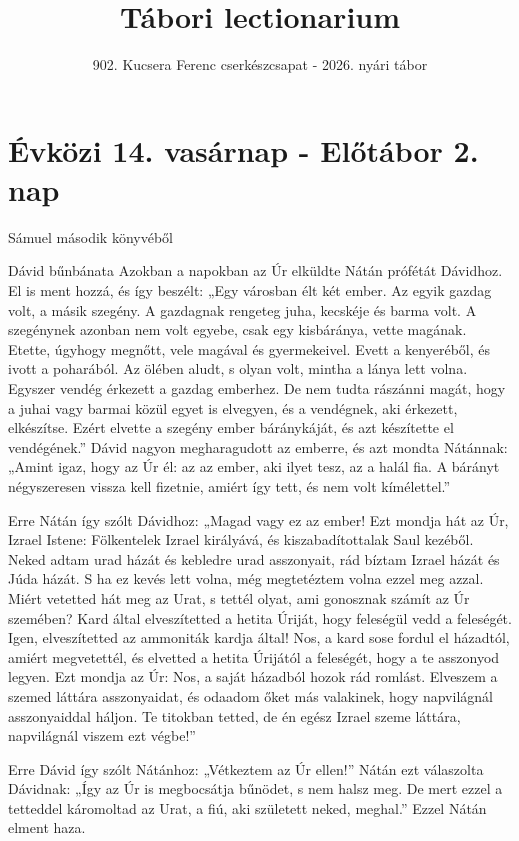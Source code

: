 \documentclass[twoside]{article}
\title{Tábori lectionarium}
\subtitle{902. Kucsera Ferenc cserkészcsapat - 2026. nyári tábor}
\begin{document}
\maketitle

\section*{Évközi 14. vasárnap - Előtábor 2. nap}

Sámuel második könyvéből

\begin{lectio}{Dávid bűnbánata}
\noindent Azokban a napokban az Úr elküldte Nátán prófétát Dávidhoz. El is ment hozzá, és így
beszélt: „Egy városban élt két ember. Az egyik gazdag volt, a másik szegény. A gazdagnak rengeteg
juha, kecskéje és barma volt. A szegénynek azonban nem volt egyebe, csak egy kisbáránya, vette
magának. Etette, úgyhogy megnőtt, vele magával és gyermekeivel. Evett a kenyeréből, és ivott a
poharából. Az ölében aludt, s olyan volt, mintha a lánya lett volna. Egyszer vendég érkezett a
gazdag emberhez. De nem tudta rászánni magát, hogy a juhai vagy barmai közül egyet is elvegyen, és a
vendégnek, aki érkezett, elkészítse. Ezért elvette a szegény ember báránykáját, és azt készítette el
vendégének.” Dávid nagyon megharagudott az emberre, és azt mondta Nátánnak: „Amint igaz, hogy az Úr
él: az az ember, aki ilyet tesz, az a halál fia. A bárányt négyszeresen vissza kell fizetnie, amiért
így tett, és nem volt kímélettel.”

Erre Nátán így szólt Dávidhoz: „Magad vagy ez az ember! Ezt mondja hát az Úr, Izrael Istene:
Fölkentelek Izrael királyává, és kiszabadítottalak Saul kezéből. Neked adtam urad házát és kebledre
urad asszonyait, rád bíztam Izrael házát és Júda házát. S ha ez kevés lett volna, még megtetéztem
volna ezzel meg azzal. Miért vetetted hát meg az Urat, s tettél olyat, ami gonosznak számít az Úr
szemében? Kard által elveszítetted a hetita Úriját, hogy feleségül vedd a feleségét. Igen,
elveszítetted az ammoniták kardja által! Nos, a kard sose fordul el házadtól, amiért megvetettél, és
elvetted a hetita Úrijától a feleségét, hogy a te asszonyod legyen. Ezt mondja az Úr: Nos, a saját
házadból hozok rád romlást. Elveszem a szemed láttára asszonyaidat, és odaadom őket más valakinek,
hogy napvilágnál asszonyaiddal háljon. Te titokban tetted, de én egész Izrael szeme láttára,
napvilágnál viszem ezt végbe!”

Erre Dávid így szólt Nátánhoz: „Vétkeztem az Úr ellen!” Nátán ezt válaszolta Dávidnak: „Így az Úr is
megbocsátja bűnödet, s nem halsz meg. De mert ezzel a tetteddel káromoltad az Urat, a fiú, aki
született neked, meghal.” Ezzel Nátán elment haza.


\end{lectio}
\end{document}
